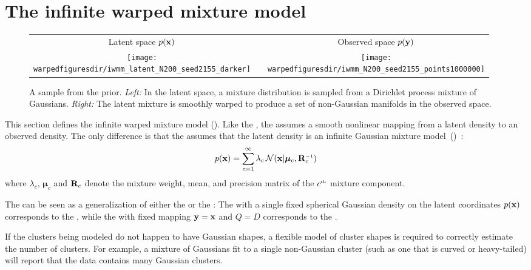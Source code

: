 \section{The infinite warped mixture model}
\label{sec:iwmm-definition}

\begin{figure}
\centering
\begin{tabular}{ccc}
Latent space $p({\bf{x}})$ & & Observed space $p({\bf{y}})$ \\
\fbox{\texttt{[image: \\warpedfiguresdir/iwmm\_latent\_N200\_seed2155\_darker]}} &
\raisebox{7em}{$\overset{ \textstyle \vf(\vx)}{ \mathlarger{\mathlarger{\mathlarger{\mathlarger{\mathlarger{ \rightarrow}}}}}}$} &
\fbox{\texttt{[image: \\warpedfiguresdir/iwmm\_N200\_seed2155\_points1000000]}}
\end{tabular}
\caption[A draw from the infinite warped mixture model prior]{
A sample from the \iwmm{} prior.
\emph{Left:} In the latent space, a mixture distribution is sampled from a Dirichlet process mixture of Gaussians.
\emph{Right:} The latent mixture is smoothly warped to produce a set of non-Gaussian manifolds in the observed space.}
\label{fig:generative}
\end{figure}


This section defines the infinite warped mixture model (\iwmm{}).
Like the \gplvm{}, the \iwmm{} assumes a smooth nonlinear mapping from a latent density to an observed density.
The only difference is that the \iwmm{} assumes that the latent density is an infinite Gaussian mixture model~(\iGMM{})~\citep{rasmussen2000infinite}:
%
\begin{align}
p(\vx ) = \sum_{c=1}^{\infty} \lambda_c \, {\cal N}(\vx|\bm{\mu}_{c},\vR_{c}\inv)
\end{align}
%
where $\lambda_{c}$, $\bm{\mu}_{c}$ and $\mathbf{R}_{c}$ denote the mixture weight, mean, and precision matrix of the $c^{\text{\tiny th}}$ mixture component.

The \iwmm{} can be seen as a generalization of either the \gplvm{} or the \iGMM{}:
The \iwmm{} with a single fixed spherical Gaussian density on the latent coordinates $p({\bf{x}})$ corresponds to the \gplvm{}, while the \iwmm{} with fixed mapping ${{\bf{y}} = {\bf{x}}}$ and 
${Q = D}$ corresponds to the \iGMM{}.

If the clusters being modeled do not happen to have Gaussian shapes, a flexible model of cluster shapes is required to correctly estimate the number of clusters.
For example, a mixture of Gaussians fit to a single non-Gaussian cluster (such as one that is curved or heavy-tailed) will report that the data contains many Gaussian clusters.

